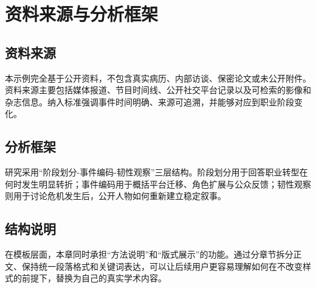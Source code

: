 \chapter{资料来源与分析框架}

\section{资料来源}

本示例完全基于公开资料，不包含真实病历、内部访谈、保密论文或未公开附件。资料来源主要包括媒体报道、节目时间线、公开社交平台记录以及可检索的影像和杂志信息。纳入标准强调事件时间明确、来源可追溯，并能够对应到职业阶段变化\cite{dugay,hall}。

\section{分析框架}

研究采用“阶段划分-事件编码-韧性观察”三层结构。阶段划分用于回答职业转型在何时发生明显转折；事件编码用于概括平台迁移、角色扩展与公众反馈；韧性观察则用于讨论危机发生后，公开人物如何重新建立稳定叙事\cite{turner}。

\section{结构说明}

在模板层面，本章同时承担“方法说明”和“版式展示”的功能。通过分章节拆分正文、保持统一段落格式和关键词表达，可以让后续用户更容易理解如何在不改变样式的前提下，替换为自己的真实学术内容。
